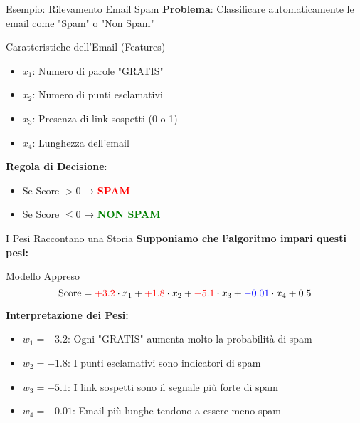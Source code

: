 \documentclass[aspectratio=169]{beamer}
\begin{document}
\begin{frame}{Esempio: Rilevamento Email Spam}
\textbf{Problema}: Classificare automaticamente le email come "Spam" o "Non Spam"

\vspace{0.5cm}

\begin{block}{Caratteristiche dell'Email (Features)}
\begin{itemize}
    \item $x_1$: Numero di parole "GRATIS"
    \item $x_2$: Numero di punti esclamativi
    \item $x_3$: Presenza di link sospetti (0 o 1)
    \item $x_4$: Lunghezza dell'email
\end{itemize}
\end{block}


\vspace{0.3cm}

\textbf{Regola di Decisione}:
\begin{itemize}
    \item Se Score $> 0$ → \textcolor{red}{\textbf{SPAM}}
    \item Se Score $\leq 0$ → \textcolor{green}{\textbf{NON SPAM}}
\end{itemize}
\end{frame}
%
%
\begin{frame}{I Pesi Raccontano una Storia}
\textbf{Supponiamo che l'algoritmo impari questi pesi:}

\vspace{0.5cm}

\begin{block}{Modello Appreso}
$$\text{Score} = \textcolor{red}{+3.2} \cdot x_1 + \textcolor{red}{+1.8} \cdot x_2 + \textcolor{red}{+5.1} \cdot x_3 + \textcolor{blue}{-0.01} \cdot x_4 + 0.5$$
\end{block}

\vspace{0.5cm}

\textbf{Interpretazione dei Pesi:}
\begin{itemize}
    \item $w_1 = +3.2$: Ogni "GRATIS" aumenta molto la probabilità di spam
    \item $w_2 = +1.8$: I punti esclamativi sono indicatori di spam
    \item $w_3 = +5.1$: I link sospetti sono il segnale più forte di spam
    \item $w_4 = -0.01$: Email più lunghe tendono a essere meno spam
\end{itemize}

\end{frame}
\end{document}

